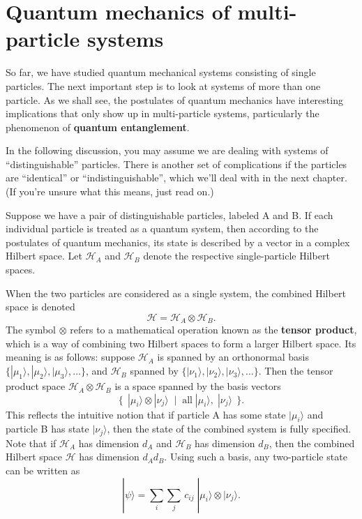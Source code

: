 \documentclass[pra,11pt]{revtex4}
\begin{document}
\section{Quantum mechanics of multi-particle systems}

So far, we have studied quantum mechanical systems consisting of
single particles.  The next important step is to look at systems of
more than one particle.  As we shall see, the postulates of quantum
mechanics have interesting implications that only show up in
multi-particle systems, particularly the phenomenon of \textbf{quantum
  entanglement}.

In the following discussion, you may assume we are dealing with
systems of ``distinguishable'' particles.  There is another set of
complications if the particles are ``identical'' or
``indistinguishable'', which we'll deal with in the next chapter.  (If
you're unsure what this means, just read on.)

Suppose we have a pair of distinguishable particles, labeled A and B.
If each individual particle is treated as a quantum system, then
according to the postulates of quantum mechanics, its state is
described by a vector in a complex Hilbert space.  Let $\mathscr{H}_A$
and $\mathscr{H}_B$ denote the respective single-particle Hilbert
spaces.

When the two particles are considered as a single system, the combined
Hilbert space is denoted
$$\mathscr{H} = \mathscr{H}_A\otimes \mathscr{H}_B.$$
The symbol $\otimes$ refers to a mathematical operation known as the
\textbf{tensor product}, which is a way of combining two Hilbert
spaces to form a larger Hilbert space.  Its meaning is as follows:
suppose $\mathscr{H}_A$ is spanned by an orthonormal basis
$\{|\mu_1\rangle, |\mu_2\rangle, |\mu_3\rangle, \dots\}$, and
$\mathscr{H}_B$ spanned by $\{|\nu_1\rangle, |\nu_2\rangle,
|\nu_3\rangle, \dots\}$.  Then the tensor product space $\mathscr{H}_A
\otimes \mathscr{H}_B$ is a space spanned by the basis vectors
$$\Big\{\;\,|\mu_i\rangle\otimes|\nu_j\rangle \;\;  \Big| \;\; \textrm{all}\;|\mu_i\rangle,\; |\nu_j\rangle \;\,\Big\}.$$
This reflects the intuitive notion that if particle A has some state
$|\mu_i\rangle$ and particle B has state $|\nu_j\rangle$, then the
state of the combined system is fully specified.  Note that if
$\mathscr{H}_A$ has dimension $d_A$ and $\mathscr{H}_B$ has dimension
$d_B$, then the combined Hilbert space $\mathscr{H}$ has dimension
$d_A d_B$.  Using such a basis, any two-particle state can be written as
$$|\psi\rangle = \sum_{i} \sum_{j} \, c_{ij}\; |\mu_i\rangle \otimes |\nu_j\rangle.$$
\end{document}
